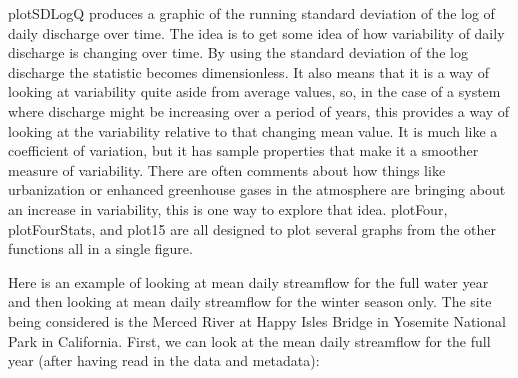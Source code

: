 \documentclass[a4paper,11pt]{article}\usepackage{graphicx, color}
\begin{document}
plotSDLogQ produces a graphic of the running standard deviation of the log of daily discharge over time.  The idea is to get some idea of how variability of daily discharge is changing over time.  By using the standard deviation of the log discharge the statistic becomes dimensionless.  It also means that it is a way of looking at variability quite aside from average values, so, in the case of a system where discharge might be increasing over a period of years, this provides a way of looking at the variability relative to that changing mean value.  It is much like a coefficient of variation, but it has sample properties that make it a smoother measure of variability.  There are often comments about how things like urbanization or enhanced greenhouse gases in the atmosphere are bringing about an increase in variability, this is one way to explore that idea. plotFour, plotFourStats, and plot15 are all designed to plot several graphs from the other functions all in a single figure. 

Here is an example of looking at mean daily streamflow for the full water year and then looking at mean daily streamflow for the winter season only.  The site being considered is the Merced River at Happy Isles Bridge in Yosemite National Park in California.  First, we can look at the mean daily streamflow for the full year (after having read in the data and metadata):
\end{document}
